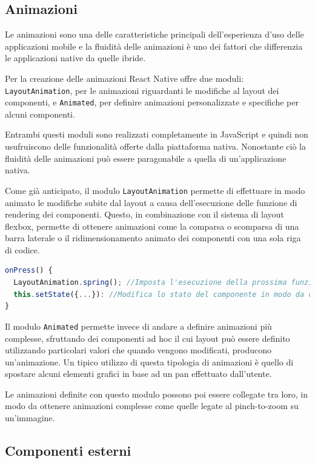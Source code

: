 \subsection{Animazioni}
Le animazioni sono una delle caratteristiche principali dell'esperienza d'uso delle applicazioni mobile e la fluidità delle animazioni è uno dei fattori che differenzia le applicazioni native da quelle ibride.

Per la creazione delle animazioni React Native offre due moduli: \texttt{LayoutAnimation}, per le animazioni riguardanti le modifiche al layout dei componenti, e \texttt{Animated}, per definire animazioni personalizzate e specifiche per alcuni componenti.

Entrambi questi moduli sono realizzati completamente in JavaScript e quindi non usufruiscono delle funzionalità offerte dalla piattaforma nativa. 
Nonostante ciò la fluidità delle animazioni può essere paragonabile a quella di un'applicazione nativa.

Come già anticipato, il modulo \texttt{LayoutAnimation} permette di effettuare in modo animato le modifiche subite dal layout a causa dell'esecuzione delle funzione di rendering dei componenti.
Questo, in combinazione con il sistema di layout flexbox, permette di ottenere animazioni come la comparsa o scomparsa di una barra laterale o il ridimensionamento animato dei componenti con una sola riga di codice.

\begin{lstlisting}[language=JavaScript, caption=Utilizzo di LayoutAnimation]
onPress() {
  LayoutAnimation.spring(); //Imposta l'esecuzione della prossima funzione di rendering in modo animato
  this.setState({...}): //Modifica lo stato del componente in modo da causarne il re-rendering
}
\end{lstlisting}

Il modulo \texttt{Animated} permette invece di andare a definire animazioni più complesse, sfruttando dei componenti ad hoc il cui layout può essere definito utilizzando particolari valori che quando vengono modificati, producono un'animazione.
Un tipico utilizzo di questa tipologia di animazioni è quello di spostare alcuni elementi grafici in base ad un \gls{pan} effettuato dall'utente.

Le animazioni definite con questo modulo possono poi essere collegate tra loro, in modo da ottenere animazioni complesse come quelle legate al \gls{pinch-to-zoom} su un'immagine.

\subsection{Componenti esterni}

